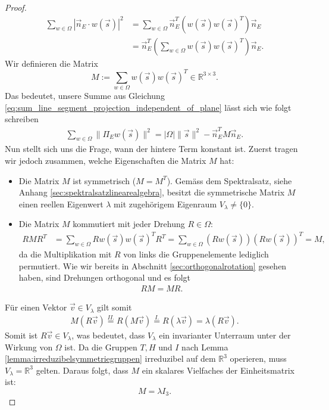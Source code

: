 \begin{proof}
    \begin{align} \label{eq:summevectormatrixnormal_revised}
        \sum_{w \in \Omega} |\vec{n}_E \cdot w(\vec{s})|^2 &= \sum_{w \in \Omega} \vec{n}_E^T \left( w(\vec{s}) w(\vec{s})^T \right) \vec{n}_E \nonumber \\
        &= \vec{n}_E^T \left( \sum_{w \in \Omega} w(\vec{s}) w(\vec{s})^T \right) \vec{n}_E.
    \end{align}
    Wir definieren die Matrix $$M := \sum_{w \in \Omega} w(\vec{s}) w(\vec{s})^T \in \mathbb{R}^{3 \times 3}.$$ 
        Das bedeutet, unsere Summe aus Gleichung \eqref{eq:sum_line_segment_projection_independent_of_plane} lässt sich wie folgt schreiben
       \begin{align} \label{eq:summemitmatrixM}
        \sum_{w \in \Omega} \|\Pi_{E}w(\vec{s})\|^2 = |\Omega|  \|\vec{s}\|^2 - \vec{n}_E^T M \vec{n}_E.
    \end{align}
    Nun stellt sich uns die Frage, wann der hintere Term konstant ist. Zuerst tragen wir jedoch zusammen, welche Eigenschaften die Matrix $M$ hat:
    \begin{itemize}
        \item[I.]  Die Matrix $M$ ist symmetrisch ($M=M^T$). Gemäss dem Spektralsatz, siehe Anhang \ref{sec:spektralsatzlinearealgebra}, besitzt die symmetrische Matrix $M$ einen reellen Eigenwert $\lambda$ mit zugehörigem Eigenraum $V_\lambda \neq \{0\}$.
        \item[II.] Die Matrix $M$ kommutiert mit jeder Drehung $R \in \Omega$:
    \begin{align}
        R M R^T &= \sum_{w \in \Omega} R w(\vec{s}) w(\vec{s})^T R^T = \sum_{w \in \Omega} (R w(\vec{s})) (R w(\vec{s}))^T= M, \nonumber
    \end{align}
 da die Multiplikation mit $R$ von links die Gruppenelemente lediglich permutiert. Wie wir bereits in Abschnitt \ref{sec:orthogonalrotation} gesehen haben, sind Drehungen orthogonal und es folgt 
 \begin{align} 
    RM = MR. \nonumber
 \end{align}
    \end{itemize}

 Für einen Vektor $\vec{v} \in V_\lambda$ gilt somit
    \begin{align}
        M(R\vec{v}) \overset{II.}{=} R(M\vec{v}) \overset{I.}{=} R(\lambda \vec{v}) = \lambda (R\vec{v}). \nonumber
    \end{align}
    Somit ist $R\vec{v} \in V_\lambda$, was bedeutet, dass $V_\lambda$ ein invarianter Unterraum unter der Wirkung von $\Omega$ ist. Da die Gruppen $T, H$ und $I$ nach Lemma \ref{lemma:irreduzibelsymmetriegruppen} irreduzibel auf dem $\mathbb{R}^3$ operieren, muss $V_\lambda = \mathbb{R}^3$ gelten. Daraus folgt, dass $M$ ein skalares Vielfaches der Einheitsmatrix ist: $$M = \lambda I_3.$$
    

\end{proof}

